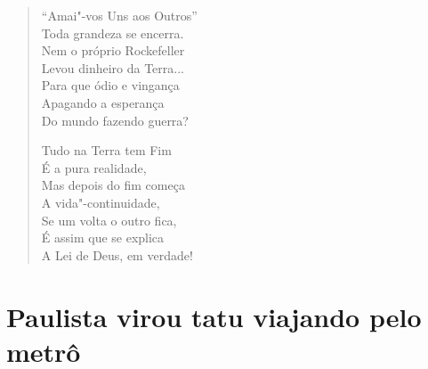 \begin{verse}
``Amai"-vos Uns aos Outros'' \\
Toda grandeza se encerra. \\
Nem o próprio Rockefeller \\
Levou dinheiro da Terra... \\
Para que ódio e vingança \\
Apagando a esperança \\
Do mundo fazendo guerra? 


Tudo na Terra tem Fim \\
É a pura realidade, \\
Mas depois do fim começa \\
A vida"-continuidade, \\
Se um volta o outro fica, \\
É assim que se explica \\
A Lei de Deus, em verdade! 
\end{verse}

\chapter{Paulista virou tatu viajando pelo metrô}

